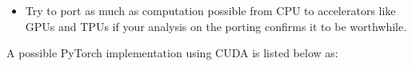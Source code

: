 {\begin{itemize}
    numerical framework you are using. For a first exposure to vectorized operations you can have a look at \cite{Hager2010}. For in depth understanding of 
    computer architecture that leads to the vectorized operations please refer to either \cite{Patterson2014} or \cite{Hennessy2019}.
    \item Try to port as much as computation possible from \ac{CPU} to accelerators like \ac{GPU}s and \ac{TPU}s if 
    your analysis on the porting confirms it to be worthwhile.
  \end{itemize}
  A possible PyTorch\cite{LFMAI2023} implementation using \ac{CUDA}\cite{Nvidia} is listed below as:
\clearpage %
}
